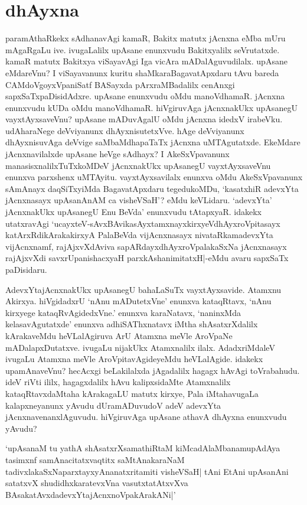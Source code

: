 \chapter{dhAyxna}\label{chap4}

paramAthaRkekx sAdhanavAgi kamaR, Bakitx matutx jAcnxna eMba mUru mAgaRgaLu ive. ivugaLalilx upAsane enunxvudu Bakitxyalilx seVrutatxde. kamaR matutx Bakitxya viSayavAgi Iga vicAra mADalAguvudilalx. upAsane eMdareVnu? I viSayavanunx kuritu shaMkaraBagavatApxdaru tAvu bareda CAMdoVgoyxVpaniSatf BASayxda pArxraMBadalilx cenAnxgi sapxSaTxpaDisidAdxre. upAsane enunxvudu oMdu manoVdhamaR. jAcnxna enunxvudu kUDa oMdu manoVdhamaR. hiVgiruvAga jAcnxnakUkx upAsanegU vayxtAyxsaveVnu? upAsane mADuvAgalU oMdu jAcnxna idedxV irabeVku. udAharaNege deVviyanunx dhAyxnisutetxVve. hAge deVviyanunx dhAyxnisuvAga deVvige saMbaMdhapaTaTx jAcnxna uMTAgutatxde. EkeMdare jAcnxnavilalxde upAsane heVge sAdhayx? I AkeSxVpavanunx manasisxnalilxTuTxkoMDeV jAcnxnakUkx upAsanegU vayxtAyxsaveVnu enunxva parxshenx uMTAyitu. vayxtAyxsavilalx enunxva oMdu AkeSxVpavanunx sAmAnayx daqSiTxyiMda BagavatApxdaru tegedukoMDu, `kasatxhiR adevxYta jAcnxnasayx upAsanAnAM ca visheVSaH'? eMdu keVLidaru. `adevxYta' jAcnxnakUkx upAsanegU Enu BeVda' enunxvudu tAtapxyaR. idakekx utatxravAgi `ucayxteV-sAvxBAvikasAyxtamxnayxkirxyeV\s dhAyxroVpitasayx katArxRdikArakakirxyA PalaBeVda vijAcnxnasayx nivataRkamadevxYta vijAcnxnamf, rajAjxvXdAviva sapARdayxdhAyxroVpalakaSxNa jAcnxnasayx rajAjxvXdi savxrUpanishacxyaH parxkAshanimitatxH|-eMdu avaru sapxSaTx paDisidaru.

AdevxYtajAcnxnakUkx upAsanegU bahaLaSuTx vayxtAyxsavide. Atamxnu Akirxya. hiVgidadxrU `nAnu mADutetxVne' enunxva kataqRtavx, `nAnu kirxyege kataqRvAgidedxVne.' enunxva karaNatavx, `naninxMda kelasavAgutatxde' enunxva adhiSAThxnatavx iMtha shAsatxrXdalilx kArakaveMdu heVLalAgiruva ArU Atamxna meVle AroVpaNe mADalapxDutatxve. ivugaLu nijakUkx Atamxnalilx ilalx. AdadxriMdaleV ivugaLu Atamxna meVle AroVpitavAgideyeMdu heVLalAgide. idakekx upamAnaveVnu? hecAcxgi beLakilalxda jAgadalilx hagagx hAvAgi toVrabahudu. ideV riVti ililx, hagagxdalilx hAvu kalipxsidaMte Atamxnalilx kataqRtavxdaMtaha kArakagaLU matutx kirxye, Pala iMtahavugaLa kalapxneyanunx yAvudu dUramADuvudoV adeV adevxYta jAcnxnavenanxlAguvudu. hiVgiruvAga upAsane athavA dhAyxna enunxvudu yAvudu?

`upAsanaM tu yathA shAsatxrXsamathiRtaM kiMcadAlaMbanamupAdAya tasimxnf samAnacitatxvaqtitx saMtAnakaraNaM tadivxlakaSxNaparxtayxyAnanatxritamiti visheVSaH| tAni EtAni upAsanAni satatxvX shudidhxkaratevxVna vasutxtatAtxvXva BAsakatAvxdadevxYtajAcnxnoVpakArakANi|'

